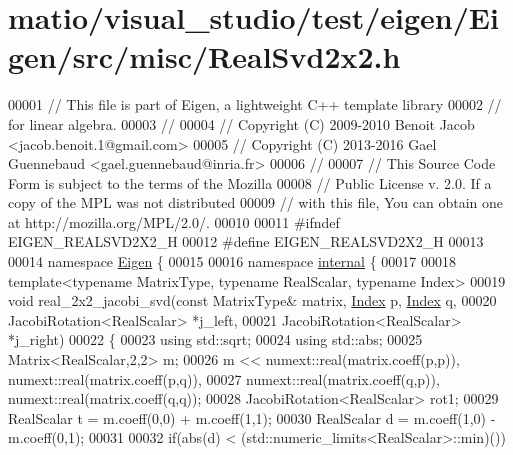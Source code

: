\hypertarget{matio_2visual__studio_2test_2eigen_2_eigen_2src_2misc_2_real_svd2x2_8h_source}{}\section{matio/visual\+\_\+studio/test/eigen/\+Eigen/src/misc/\+Real\+Svd2x2.h}
\label{matio_2visual__studio_2test_2eigen_2_eigen_2src_2misc_2_real_svd2x2_8h_source}

\begin{DoxyCode}
00001 \textcolor{comment}{// This file is part of Eigen, a lightweight C++ template library}
00002 \textcolor{comment}{// for linear algebra.}
00003 \textcolor{comment}{//}
00004 \textcolor{comment}{// Copyright (C) 2009-2010 Benoit Jacob <jacob.benoit.1@gmail.com>}
00005 \textcolor{comment}{// Copyright (C) 2013-2016 Gael Guennebaud <gael.guennebaud@inria.fr>}
00006 \textcolor{comment}{//}
00007 \textcolor{comment}{// This Source Code Form is subject to the terms of the Mozilla}
00008 \textcolor{comment}{// Public License v. 2.0. If a copy of the MPL was not distributed}
00009 \textcolor{comment}{// with this file, You can obtain one at http://mozilla.org/MPL/2.0/.}
00010 
00011 \textcolor{preprocessor}{#ifndef EIGEN\_REALSVD2X2\_H}
00012 \textcolor{preprocessor}{#define EIGEN\_REALSVD2X2\_H}
00013 
00014 \textcolor{keyword}{namespace }\hyperlink{namespace_eigen}{Eigen} \{
00015 
00016 \textcolor{keyword}{namespace }\hyperlink{namespaceinternal}{internal} \{
00017 
00018 \textcolor{keyword}{template}<\textcolor{keyword}{typename} MatrixType, \textcolor{keyword}{typename} RealScalar, \textcolor{keyword}{typename} Index>
00019 \textcolor{keywordtype}{void} real\_2x2\_jacobi\_svd(\textcolor{keyword}{const} MatrixType& matrix, \hyperlink{namespace_eigen_a62e77e0933482dafde8fe197d9a2cfde}{Index} p, \hyperlink{namespace_eigen_a62e77e0933482dafde8fe197d9a2cfde}{Index} q,
00020                          JacobiRotation<RealScalar> *j\_left,
00021                          JacobiRotation<RealScalar> *j\_right)
00022 \{
00023   \textcolor{keyword}{using} std::sqrt;
00024   \textcolor{keyword}{using} std::abs;
00025   Matrix<RealScalar,2,2> m;
00026   m << numext::real(matrix.coeff(p,p)), numext::real(matrix.coeff(p,q)),
00027        numext::real(matrix.coeff(q,p)), numext::real(matrix.coeff(q,q));
00028   JacobiRotation<RealScalar> rot1;
00029   RealScalar t = m.coeff(0,0) + m.coeff(1,1);
00030   RealScalar d = m.coeff(1,0) - m.coeff(0,1);
00031 
00032   \textcolor{keywordflow}{if}(abs(d) < (std::numeric\_limits<RealScalar>::min)())

\end{DoxyCode}
